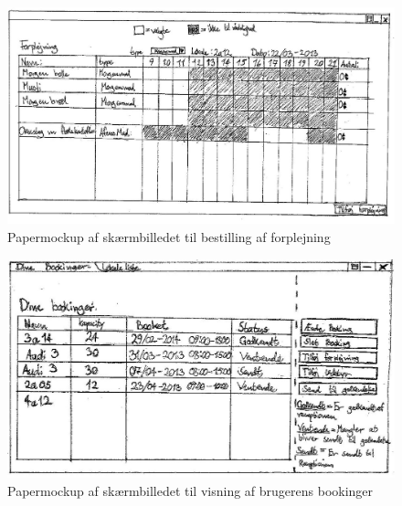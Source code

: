 \begin{figure}[h!]
  \centering
    \includegraphics[angle=90, height=0.9\textheight]{Appendix/GUI-Prototype/PaperMockup/Forplejning_001}
  \caption{Papermockup af  skærmbilledet til bestilling af forplejning}
\label{App_GUI_paper_Forplejning}
\end{figure}

\begin{figure}[h!]
  \centering
    \includegraphics[angle=90, height=0.9\textheight]{Appendix/GUI-Prototype/PaperMockup/Dinebookinger_001}
  \caption{Papermockup af  skærmbilledet til visning af brugerens bookinger}
\label{App_GUI_paper_DineBookinger}
\end{figure}

